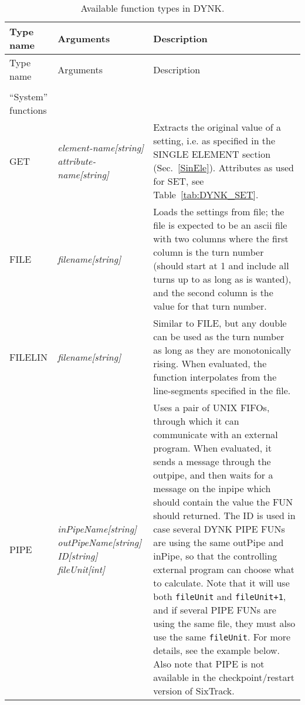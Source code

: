\documentclass[a4paper,11pt]{report}
\begin{document}
\pagebreak
\begin{center}
\begin{longtable}{|p{2.25cm} | p{4cm} p{9.5cm}|}
  \caption{Available function types in DYNK.}
  \label{tab:DYNK_FUN} \\*
  \hline
  \rowcolor{blue!30}
  Type name & Arguments & Description \\*
  \hline
  \endfirsthead

  \hline
  \rowcolor{blue!30}
  Type name & Arguments & Description \\*
  \endhead

  \rowcolor{gray!15}
  \multicolumn{3}{|c|}{(The table continues on the next page)}\\*
  \hline
  \endfoot
  
  \hline
  \endlastfoot

  \rowcolor{blue!15}
  ``System'' functions & & \\*

  GET        & \emph{element-name[string] attribute-name[string]} & 
  Extracts the original value of a setting, i.e. as specified in the SINGLE ELEMENT section (Sec.~\ref{SinEle}). Attributes as used for SET, see Table~\ref{tab:DYNK_SET}. \\*

  FILE       & \emph{filename[string]} &
  Loads the settings from file; the file is expected to be an ascii file with two columns where the first column is the turn number (should start at 1 and include all turns up to as long as is wanted), and the second column is the value for that turn number.\\*
  
  FILELIN    & \emph{filename[string]} &
  Similar to FILE, but any double can be used as the turn number as long as they are monotonically rising.
  When evaluated, the function interpolates from the line-segments specified in the file. \\*
  
  PIPE       & \emph{inPipeName[string] outPipeName[string] ID[string] fileUnit[int]} &
  Uses a pair of UNIX FIFOs, through which it can communicate with an external program.
  When evaluated, it sends a message through the outpipe, and then waits for a message on the inpipe which should contain the value the FUN should returned.
  The ID is used in case several DYNK PIPE FUNs are using the same outPipe and inPipe, so that the controlling external program can choose what to calculate.
  Note that it will use both \texttt{fileUnit} and \texttt{fileUnit+1}, and if several PIPE FUNs are using the same file, they must also use the same \texttt{fileUnit}.
  For more details, see the example below.
  Also note that PIPE is not available in the checkpoint/restart version of SixTrack.\\*
  

\end{longtable}
\end{center}
\end{document}

